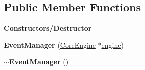 \subsection*{Public Member Functions}
\begin{Indent}\textbf{ Constructors/\+Destructor}\par
\begin{DoxyCompactItemize}
\item 
\mbox{\label{classrev_1_1_event_manager_ab65b6c6f75cacb2ffd59f246e44171d1}} 
{\bfseries Event\+Manager} (\mbox{\hyperlink{classrev_1_1_core_engine}{Core\+Engine}} $\ast$\mbox{\hyperlink{classrev_1_1_manager_a0fbd0df6b4f3caf42b557f9702f48171}{engine}})
\item 
\mbox{\label{classrev_1_1_event_manager_ad7bb200a6230619b2adc0b3f70898e86}} 
{\bfseries $\sim$\+Event\+Manager} ()
\end{DoxyCompactItemize}
\end{Indent}
